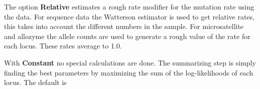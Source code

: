 \begin{description}
The option {\bf Relative} estimates a rough rate modifier for the mutation rate using the data. For sequence data the Watterson estimator is used to get relative rates, this takes into account the different numbers in the sample. For microsatellite and allozyme the allele counts are used to generate a rough value of the rate for each locus. These rates average to 1.0.

With {\bf Constant} no special calculations are done. The summarizing step is simply finding the 
best parameters by maximizing the sum of the log-likelihoods of each locus.
The default is {}

\end{description}




